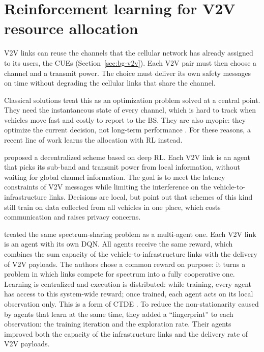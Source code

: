 \section{Reinforcement learning for V2V resource allocation}
\label{sec:rw-v2v}

\ac{V2V} links can reuse the channels that the cellular network has already assigned to its users, the
\acp{CUE} (Section~\ref{sec:bg-v2v}). Each \ac{V2V} pair must then choose a channel and a transmit
power. The choice must deliver its own safety messages on time without degrading the cellular links that
share the channel.

Classical solutions treat this as an optimization problem solved at a central point. They need the
instantaneous state of every channel, which is hard to track when vehicles move fast and costly to report
to the \ac{BS}. They are also myopic: they optimize the current decision, not long-term performance
\cite{li+22fedmarl}. For these reasons, a recent line of work learns the allocation with \ac{RL}
instead.

\citet{ye+19drl} proposed a decentralized scheme based on deep \ac{RL}. Each \ac{V2V} link is an agent
that picks its sub-band and transmit power from local information, without waiting for global channel
information. The goal is to meet the latency constraints of \ac{V2V} messages while limiting the
interference on the vehicle-to-infrastructure links. Decisions are local, but \citet{li+22fedmarl} point
out that schemes of this kind still train on data collected from all vehicles in one place, which costs
communication and raises privacy concerns.

\citet{liang+19spectrum} treated the same spectrum-sharing problem as a multi-agent one. Each \ac{V2V}
link is an agent with its own \ac{DQN}. All agents receive the same reward, which combines the sum
capacity of the vehicle-to-infrastructure links with the delivery of \ac{V2V} payloads. The authors chose
a common reward on purpose: it turns a problem in which links compete for spectrum into a fully
cooperative one. Learning is centralized and execution is distributed: while training, every agent has
access to this system-wide reward; once trained, each agent acts on its local observation only. This is a
form of \ac{CTDE} \cite{amato24cooperative}. To reduce the non-stationarity caused by agents that learn at
the same time, they added a ``fingerprint'' to each observation: the training iteration and the
exploration rate. Their agents improved both the capacity of the infrastructure links and the delivery
rate of \ac{V2V} payloads.

